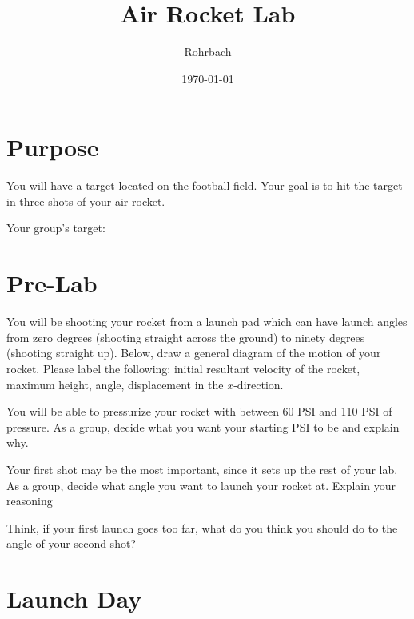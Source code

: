\documentclass[10pt]{exam}
\title{Air Rocket Lab}
\author{Rohrbach}
\date{\today}
\begin{document}
\maketitle

\section*{Purpose}

You will have a target located on the football field.  Your goal is to hit the target in three shots of your air rocket.

\begin{center}
  Your group's target: \fillin[][10em]
\end{center}

\section*{Pre-Lab}

\begin{questions}

  \question
    You will be shooting your rocket from a launch pad which can have launch angles from zero degrees (shooting straight across the ground) to ninety degrees (shooting straight up).  Below, draw a general diagram of the motion of your rocket.  Please label the following: initial resultant velocity of the rocket, maximum height, angle, displacement in the $x$-direction.

    \vspace{10em}


  \question
    You will be able to pressurize your rocket with between 60 PSI and 110 PSI of pressure.  As a group, decide what you want your starting PSI to be and explain why.
    \vs

  \question
    Your first shot may be the most important, since it sets up the rest of your lab.  As a group, decide what angle you want to launch your rocket at.  Explain your reasoning
    \vs

  \question
    Think, if your first launch goes too far, what do you think you should do to the angle of your second shot?
    \vs


  \pagebreak

\end{questions}

\section*{Launch Day}
\end{document}
